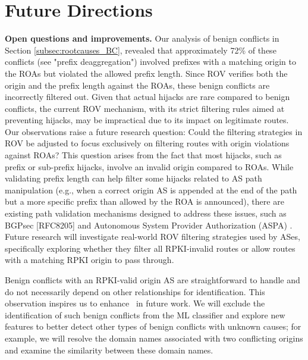 \vspace{-10pt}
\section{Future Directions} \label{sec:lov_future}

\noindent\textbf{Open questions and improvements.} Our analysis of benign conflicts in Section \ref{subsec:rootcauses_BC}, revealed that approximately 72\% of these conflicts (see "prefix deaggregation") involved prefixes with a matching origin to the ROAs but violated the allowed prefix length.
Since ROV verifies both the origin and the prefix length against the ROAs, these benign conflicts are incorrectly filtered out.
Given that actual hijacks are rare compared to benign conflicts, the current ROV mechanism, with its strict filtering rules aimed at preventing hijacks, may be impractical due to its impact on legitimate routes.
Our observations raise a future research question: Could the filtering strategies in ROV be adjusted to focus exclusively on filtering routes with origin violations against ROAs? This question arises from the fact that most hijacks, such as prefix or sub-prefix hijacks, involve an invalid origin compared to ROAs. While validating prefix length can help filter some hijacks related to AS path manipulation (e.g., when a correct origin AS is appended at the end of the path but a more specific prefix than allowed by the ROA is announced), there are existing path validation mechanisms designed to address these issues, such as BGPsec [RFC8205] and Autonomous System Provider Authorization (ASPA) \cite{aspa}.
Future research will investigate real-world ROV filtering strategies used by ASes, specifically exploring whether they filter all RPKI-invalid routes or allow routes with a matching RPKI origin to pass through.

Benign conflicts with an RPKI-valid origin AS are straightforward to handle and do not necessarily depend on other relationships for identification. This observation inspires us to enhance \lov\ in future work. We will exclude the identification of such benign conflicts from the ML classifier and explore new features to better detect other types of benign conflicts with unknown causes; for example, we will resolve the domain names associated with two conflicting origins and examine the similarity between these domain names.

